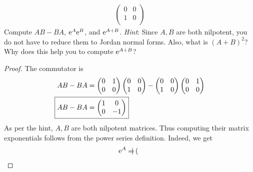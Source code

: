 \documentclass[../psets.tex]{subfiles}
\begin{document}
\begin{enumerate}
\begin{enumerate}
\begin{align*}
\begin{pmatrix}
                0 & 0\\
                1 & 0\\
            \end{pmatrix}
        \end{align*}
        Compute $AB-BA$, $\e[A]\e[B]$, and $\e[A+B]$. \emph{Hint}: Since $A,B$ are both nilpotent, you do not have to reduce them to Jordan normal forms. Also, what is $(A+B)^2$? Why does this help you to compute $\e[A+B]$?
        \begin{proof}
            The commutator is
            \begin{align*}
                AB-BA &=
                \begin{pmatrix}
                    0 & 1\\
                    0 & 0\\
                \end{pmatrix}
                \begin{pmatrix}
                    0 & 0\\
                    1 & 0\\
                \end{pmatrix}
                -
                \begin{pmatrix}
                    0 & 0\\
                    1 & 0\\
                \end{pmatrix}
                \begin{pmatrix}
                    0 & 1\\
                    0 & 0\\
                \end{pmatrix}\\
                \Aboxed{
                    AB-BA &= {
                        \begin{pmatrix}
                            1 & 0\\
                            0 & -1\\
                        \end{pmatrix}
                    }
                }
            \end{align*}
            As per the hint, $A,B$ are both nilpotent matrices. Thus computing their matrix exponentials follows from the power series definition. Indeed, we get
            \begin{align*}
                \e[A] &=
                \begin{pmatrix}

\end{pmatrix}
\end{align*}
\end{proof}
\end{enumerate}
\end{enumerate}
\end{document}
